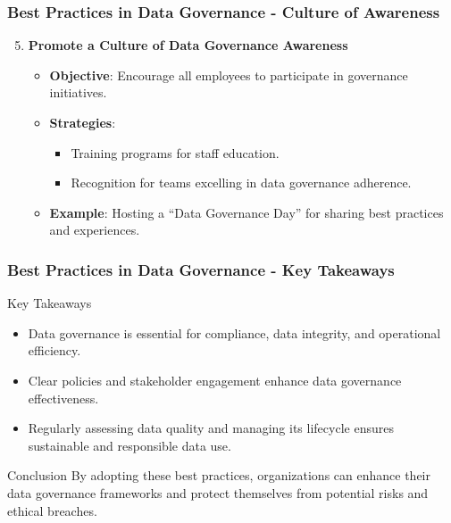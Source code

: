 \documentclass{beamer}
\begin{document}
\begin{frame}[fragile]
    \frametitle{Best Practices in Data Governance - Culture of Awareness}
    \begin{enumerate}
        \setcounter{enumi}{4}
        \item \textbf{Promote a Culture of Data Governance Awareness}
        \begin{itemize}
            \item \textbf{Objective}: Encourage all employees to participate in governance initiatives.
            \item \textbf{Strategies}:
                \begin{itemize}
                    \item Training programs for staff education.
                    \item Recognition for teams excelling in data governance adherence.
                \end{itemize}
            \item \textbf{Example}: Hosting a “Data Governance Day” for sharing best practices and experiences.
        \end{itemize}
    \end{enumerate}
\end{frame}

\begin{frame}[fragile]
    \frametitle{Best Practices in Data Governance - Key Takeaways}
    \begin{block}{Key Takeaways}
        \begin{itemize}
            \item Data governance is essential for compliance, data integrity, and operational efficiency.
            \item Clear policies and stakeholder engagement enhance data governance effectiveness.
            \item Regularly assessing data quality and managing its lifecycle ensures sustainable and responsible data use.
        \end{itemize}
    \end{block}

    \begin{block}{Conclusion}
        By adopting these best practices, organizations can enhance their data governance frameworks and protect themselves from potential risks and ethical breaches.
    \end{block}
\end{frame}
\end{document}
